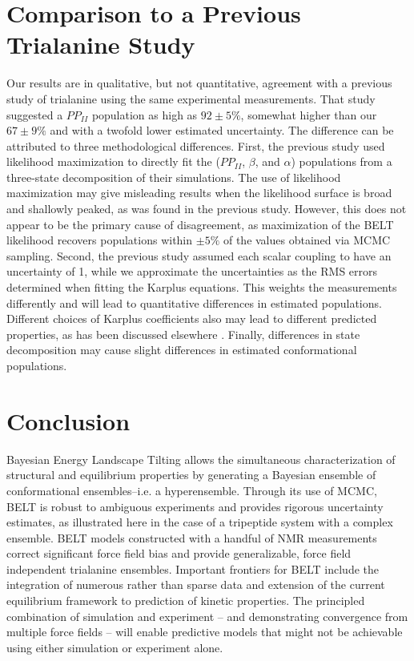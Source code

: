\documentclass[journal=jacsat,manuscript=article]{achemso}
\begin{document}
\section*{Comparison to a Previous Trialanine Study}

Our results are in qualitative, but not quantitative, agreement with a previous study of trialanine \cite{Graf2007} using the same experimental measurements.  That study suggested a $PP_{II}$ population as high as $92 \pm 5\%$, somewhat higher than our $67 \pm 9 \%$ and with a twofold lower estimated uncertainty.  The difference can be attributed to three methodological differences.  First, the previous study used likelihood maximization to directly fit the ($PP_{II}$, $\beta$, and $\alpha$) populations from a three-state decomposition of their simulations.  The use of likelihood maximization may give misleading results when the likelihood surface is broad and shallowly peaked, as was found in the previous study.  However, this does not appear to be the primary cause of disagreement, as maximization of the BELT likelihood recovers populations within $\pm 5\%$ of the values obtained via MCMC sampling.  Second, the previous study assumed each scalar coupling to have an uncertainty of 1, while we approximate the uncertainties as the RMS errors 
determined when fitting the Karplus equations.  This weights the measurements differently and will lead to quantitative differences in estimated populations.  Different choices of Karplus coefficients also may lead to different predicted properties, as has been discussed elsewhere \cite{markwick2009structural}.    Finally, differences in state decomposition may cause slight differences in estimated conformational populations.  



\section*{Conclusion}

Bayesian Energy Landscape Tilting allows the simultaneous characterization of structural and equilibrium properties by generating a Bayesian ensemble of conformational ensembles--i.e. a hyperensemble.  Through its use of MCMC, BELT is robust to ambiguous experiments and provides rigorous uncertainty estimates, as illustrated here in the case of a tripeptide system with a complex ensemble.  BELT models constructed with a handful of NMR measurements correct significant force field bias and provide generalizable, force field independent trialanine ensembles. Important frontiers for BELT include the integration of numerous rather than sparse data and extension of the current equilibrium framework to prediction of kinetic properties.  The principled combination of simulation and experiment -- and demonstrating convergence from multiple force fields --  will enable predictive models that might not be achievable using either simulation or experiment alone.  
\end{document}
